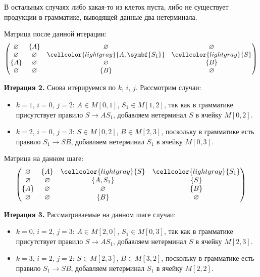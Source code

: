 \begin{example}
    В остальных случаях либо какая-то из клеток пуста, либо не существует продукции в грамматике, выводящей данные два нетерминала.

    Матрица после данной итерации:
    \[
        \begin{pmatrix}
            \varnothing & \{A\}       & \varnothing                             & \varnothing                \\
            \varnothing & \varnothing & \cellcolor{lightgray}\{A, \symbf{S_1}\} & \cellcolor{lightgray}\{S\} \\
            \{A\}       & \varnothing & \varnothing                             & \{B\}                      \\
            \varnothing & \varnothing & \{B\}                                   & \varnothing
        \end{pmatrix}
    \]

    \textbf{Итерация 2.}
    Снова итерируемся по $k$, $i$, $j$.
    Рассмотрим случаи:
    \begin{itemize}
        \item $k = 1$, $i = 0$, $j = 2$: $A \in M[0, 1]$, $S_1 \in M[1, 2]$, так как в грамматике присутствует правило $S \to A S_1$, добавляем нетерминал $S$ в ячейку $M[0, 2]$.
        \item $k = 2$, $i = 0$, $j = 3$: $S \in M[0, 2]$, $B \in M[2, 3]$, поскольку в грамматике есть правило $S_1 \to S B$, добавляем нетерминал $S_1$ в ячейку $M[0, 3]$.
    \end{itemize}

    Матрица на данном шаге:
    \[
        \begin{pmatrix}
            \varnothing & \{A\}       & \cellcolor{lightgray}\{S\} & \cellcolor{lightgray}\{S_1\} \\
            \varnothing & \varnothing & \{A, S_1\}                 & \{S\}                        \\
            \{A\}       & \varnothing & \varnothing                & \{B\}                        \\
            \varnothing & \varnothing & \{B\}                      & \varnothing
        \end{pmatrix}
    \]

    \textbf{Итерация 3.}
    Рассматриваемые на данном шаге случаи:
    \begin{itemize}
        \item $k = 0$, $i = 2$, $j = 3$: $A \in M[2, 0]$, $S_1 \in M[0, 3]$, так как в грамматике присутствует правило $S \to A S_1$, добавляем нетерминал $S$ в ячейку $M[2, 3]$.
        \item $k = 3$, $i = 2$, $j = 2$: $S \in M[2, 3]$, $B \in M[3, 2]$, поскольку в грамматике есть правило $S_1 \to S B$, добавляем нетерминал $S_1$ в ячейку $M[2, 2]$.
    \end{itemize}


\end{example}
